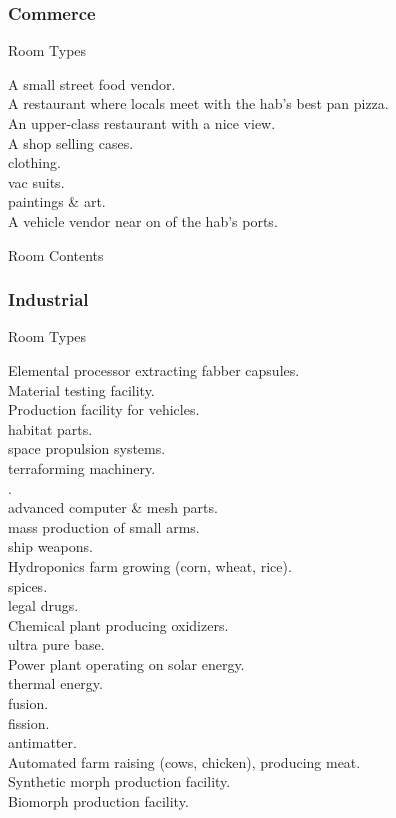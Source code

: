 \documentclass[a4]{article}
\begin{document}
\subsubsection{Commerce}


Room Types

\starttableone
A small street food vendor.\\
A restaurant where locals meet with the hab's best pan pizza.\\
An upper-class restaurant with a nice view.\\
A shop selling cases.\\
\textellipsis clothing.\\
\textellipsis vac suits.\\
\textellipsis paintings \& art.\\
A vehicle vendor near on of the hab's ports.\\
\stoptableone


Room Contents

\starttableone
\stoptableone




\subsubsection{Industrial}


Room Types

\starttableone
Elemental processor extracting fabber capsules.\\
Material testing facility.\\
Production facility for vehicles.\\
\textellipsis habitat parts.\\
\textellipsis space propulsion systems.\\
\textellipsis terraforming machinery.\\
\textellipsis {}.\\
\textellipsis advanced computer \& mesh parts.\\
\textellipsis mass production of small arms.\\
\textellipsis ship weapons.\\
Hydroponics farm growing (corn, wheat, rice).\\
\textellipsis spices.\\
\textellipsis legal drugs.\\
Chemical plant producing oxidizers.\\
\textellipsis ultra pure  base.\\
Power plant operating on solar energy.\\
\textellipsis thermal energy.\\
\textellipsis fusion.\\
\textellipsis fission.\\
\textellipsis antimatter.\\
Automated farm raising (cows, chicken), producing meat.\\
Synthetic morph production facility.\\
Biomorph production facility.\\
\stoptableone
\end{document}
